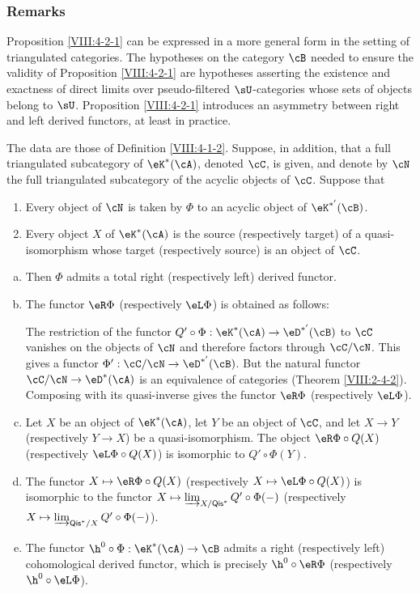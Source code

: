 \documentclass[oneside]{book}
\begin{document}
\subsubsection{Remarks}\label{VIII:4-2-2}

Proposition \ref{VIII:4-2-1} can be expressed in a more general form in
the setting of triangulated categories. The hypotheses on the category
$\cB$ needed to ensure the validity of Proposition \ref{VIII:4-2-1} are
hypotheses asserting the existence and exactness of direct limits over
pseudo-filtered $\sU$-categories whose sets of objects belong to $\sU$.
Proposition \ref{VIII:4-2-1} introduces an asymmetry between right and
left derived functors, at least in practice.

\begin{theorem}\label{VIII:4-2-3} %
The data are those of Definition \ref{VIII:4-1-2}. Suppose, in addition,
that a full triangulated subcategory of $\eK^\ast(\cA)$, denoted $\cC$, is given,
and denote by $\cN$ the full triangulated subcategory of the acyclic
objects of $\cC$. Suppose that
\begin{enumerate}[(1)]
  \item Every object of $\cN$ is taken by $\Phi$ to an acyclic object of
    $\eK^{\ast'}(\cB)$.
  \item Every object $X$ of $\eK^\ast(\cA)$ is the source (respectively
    target) of a quasi-isomorphism whose target (respectively source) is
    an object of $\cC$.
\end{enumerate}
\begin{enumerate}[a)]
  \item Then $\Phi$ admits a total right (respectively left) derived
    functor.
  \item The functor $\eR \Phi$ (respectively $\eL \Phi$) is obtained as
    follows:

    The restriction of the functor
    $Q'\circ \Phi:\eK^\ast(\cA) \to \eD^{\ast'}(\cB)$ to $\cC$ vanishes on the
    objects of $\cN$ and therefore factors through $\cC/\cN$. This gives
    a functor $\Phi':\cC/\cN\to \eD^{\ast'}(\cB)$. But the natural
    functor $\cC/\cN\to \eD^\ast(\cA)$ is an equivalence of categories
    (Theorem \ref{VIII:2-4-2}). Composing with its quasi-inverse gives the
    functor $\eR\Phi$ (respectively $\eL \Phi$).
  \item Let $X$ be an object of $\eK^\ast(\cA)$, let $Y$ be an object of
    $\cC$, and let $X\to Y$ (respectively $Y\to X$) be a
    quasi-isomorphism. The object $\eR\Phi\circ Q(X)$ (respectively
    $\eL \Phi\circ Q(X)$) is isomorphic to $Q'\circ \Phi(Y)$.
  \item The functor $X\mapsto \eR\Phi\circ Q(X)$ (respectively
    $X\mapsto \eL \Phi\circ Q(X)$) is isomorphic to the functor
    $X\mapsto \varinjlim_{X/\mathsf{Qis}^\ast} Q'\circ\Phi(-)$
    (respectively
    $X\mapsto \varinjlim_{\mathsf{Qis}^\ast/X} Q'\circ \Phi(-)$).
  \item The functor $\h^0{}\circ \Phi:\eK^\ast(\cA)\to \cB$ admits a
    right (respectively left) cohomological derived functor, which is
    precisely $\h^0{}\circ\eR\Phi$ (respectively
    $\h^0{}\circ \eL\Phi$).
\end{enumerate}
\end{theorem}
\end{document}

